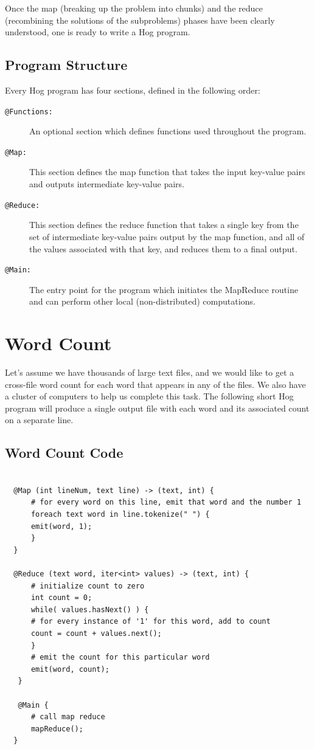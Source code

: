 \documentclass{report}
\begin{document}
Once the map (breaking up the problem into chunks) and the reduce (recombining the solutions of the subproblems) phases have been clearly understood, one is ready to write a Hog program.

\subsection{Program Structure} %
\label{sub:program_structure}
Every Hog program has four sections, defined in the following order:
\begin{description}
\item[\tt @Functions\rm:] An optional section which defines functions used throughout the program.
\item[\tt @Map\rm:] This section defines the map function that takes the input key-value pairs and outputs intermediate key-value pairs.
\item[\tt @Reduce\rm:] This section defines the reduce function that takes a single key from the set of intermediate key-value pairs output by the map function, and all of the values associated with that key, and reduces them to a final output.
\item [\tt @Main\rm:] The entry point for the program which initiates the MapReduce routine and can perform other local (non-distributed) computations.
\end{description}

\section{Word Count} 
\label{word_count} 

Let's assume we have thousands of large text files, and we would like to get a
cross-file word count for each word that appears in any of the files. We also have
a cluster of computers to help us complete this task. The following short Hog
program will produce a single output file with each word and its associated count
on a separate line.

\subsection{Word Count Code}
\begin{verbatim}

  @Map (int lineNum, text line) -> (text, int) {
      # for every word on this line, emit that word and the number 1
      foreach text word in line.tokenize(" ") {
	  emit(word, 1);
      }
  }

  @Reduce (text word, iter<int> values) -> (text, int) {
      # initialize count to zero
      int count = 0;
      while( values.hasNext() ) {
	  # for every instance of '1' for this word, add to count
	  count = count + values.next();
      }
      # emit the count for this particular word
      emit(word, count);
   }

   @Main {
      # call map reduce
      mapReduce();
  }
      
\end{verbatim}
\end{document}
